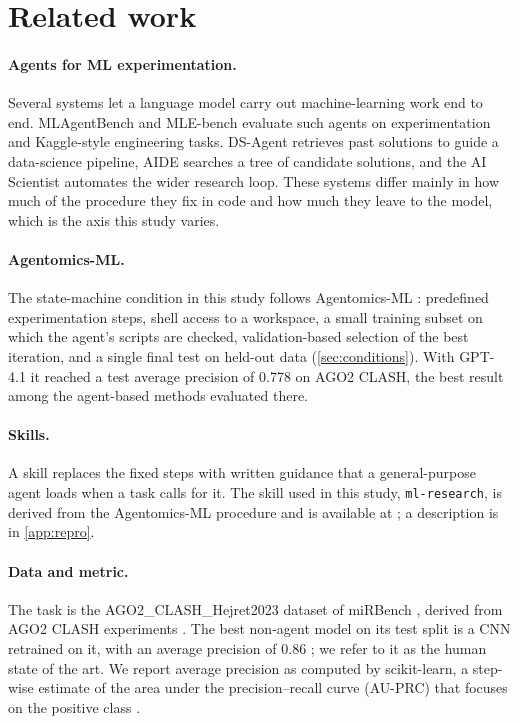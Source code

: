 \section{Related work}\label{sec:related}

\paragraph{Agents for ML experimentation.} Several systems let a language model carry out machine-learning work end to
end. MLAgentBench \citep{huang2024mlagentbench} and MLE-bench \citep{chan2024mlebench} evaluate such agents on
experimentation and Kaggle-style engineering tasks. DS-Agent \citep{guo2024dsagent} retrieves past solutions to guide a
data-science pipeline, AIDE \citep{jiang2025aide} searches a tree of candidate solutions, and the AI Scientist
\citep{lu2024aiscientist} automates the wider research loop. These systems differ mainly in how much of the procedure
they fix in code and how much they leave to the model, which is the axis this study varies.

\paragraph{Agentomics-ML.} The state-machine condition in this study follows Agentomics-ML \citep{martinek2025agentomics}: predefined experimentation steps, shell access to a workspace, a small training subset on which
the agent's scripts are checked, validation-based selection of the best iteration, and a single final test on held-out
data (\cref{sec:conditions}). With GPT-4.1 it reached a test average precision of 0.778 on AGO2 CLASH, the best result
among the agent-based methods evaluated there.

\paragraph{Skills.} A skill replaces the fixed steps with written guidance that a general-purpose agent loads when a
task calls for it. The skill used in this study, \texttt{ml-research}, is derived from the Agentomics-ML procedure
\citep{martinek2025agentomics} and is available at \citet{alexiou2025distill}; a description is in \cref{app:repro}.

\paragraph{Data and metric.} The task is the AGO2\_CLASH\_Hejret2023 dataset of miRBench \citep{sammut2025mirbench},
derived from AGO2 CLASH experiments \citep{hejret2023}. The best non-agent model on its test split is a CNN retrained
on it, with an average precision of 0.86 \citep{sammut2025mirbench}; we refer to it as the human state of the art. We
report average precision as computed by scikit-learn, a step-wise estimate of the area under the precision--recall
curve (AU-PRC) that focuses on the positive class \citep{davis2006prroc}.
